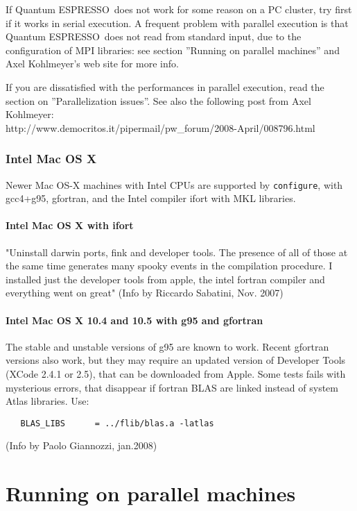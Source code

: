 \documentclass[12pt,a4paper]{article}
\def\qe{{\sc Quantum ESPRESSO}}
\begin{document}
If \qe\ does not work for some reason on a PC cluster,
try first if it works in serial execution. A frequent problem with parallel
execution is that \qe\ does not read from standard input,
due to the configuration of MPI libraries: see section 
''Running on parallel machines'' and Axel Kohlmeyer's web site for
more info. 

If you are dissatisfied with the performances in parallel execution,
read the section on ''Parallelization issues''. See also the following
post from Axel Kohlmeyer:\\
http://www.democritos.it/pipermail/pw\_forum/2008-April/008796.html

\subsubsection{Intel Mac OS X}

Newer Mac OS-X machines with Intel CPUs are supported by \texttt{configure},
with gcc4+g95, gfortran, and the Intel compiler ifort with MKL libraries.

\paragraph{Intel Mac OS X with ifort}

"Uninstall darwin ports, fink and developer tools. The presence of all of
those at the same time generates many spooky events in the compilation
procedure.  I installed just the developer tools from apple, the intel
fortran compiler and everything went on great" (Info by Riccardo Sabatini, 
Nov. 2007)

\paragraph{Intel Mac OS X 10.4 and 10.5 with g95 and gfortran}

The stable and unstable versions of g95 are known to work. Recent
gfortran versions also work, but they may require an updated version
of Developer Tools (XCode 2.4.1 or 2.5), that can be downloaded from
Apple. Some tests fails with mysterious errors, that disappear if
fortran BLAS are linked instead of system Atlas libraries. Use: 
\begin{verbatim}
   BLAS_LIBS      = ../flib/blas.a -latlas
\end{verbatim}
(Info by Paolo Giannozzi, jan.2008)

\section{Running on parallel machines}
\end{document}
